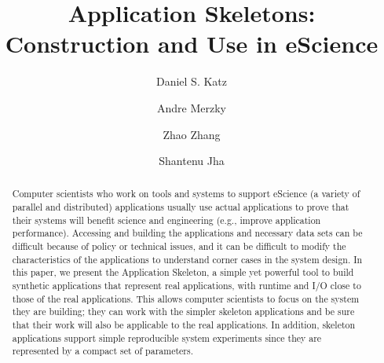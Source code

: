 \documentclass[preprint,12pt]{elsarticle}
\begin{document}
\begin{frontmatter}



\title{Application Skeletons: Construction and Use in eScience}


\author[ucanl]{Daniel S. Katz}

\author[rutgers]{Andre Merzky}

\author[ucb]{Zhao Zhang}

\author[rutgers]{Shantenu Jha}


\address[ucanl]{Computation Institute, University of Chicago \& Argonne National Laboratory, Chicago, IL, USA}
\address[rutgers]{RADICAL Laboratory, Rutgers University, New Brunswick, NJ, USA}
\address[ucb]{AMPLab, University of California, Berkeley, CA, USA}


\begin{abstract}

Computer scientists who work on tools and systems to support
eScience (a variety of parallel and distributed) applications usually use actual applications to prove that their
systems will benefit science and engineering (e.g., improve application performance). Accessing and building the applications and necessary data sets can be difficult because of policy
or technical issues, and it can be difficult to modify the characteristics of the applications to understand corner cases in the system design.
In this paper, we present the Application Skeleton, a simple yet powerful 
tool to build synthetic applications that represent real applications, with runtime and I/O 
close to those of the real applications. This allows computer 
scientists to focus on the system they are building; they can work with the simpler skeleton 
applications and be sure that their work will also be applicable to the real applications. 
In addition, skeleton applications support simple
reproducible system experiments since they are represented by a compact set of parameters.


\end{abstract}
\end{frontmatter}
\end{document}

